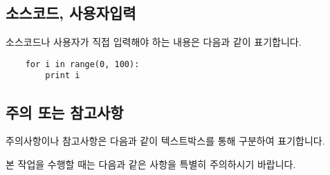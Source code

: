 \subsection*{소스코드, 사용자입력}
소스코드나 사용자가 직접 입력해야 하는 내용은 다음과 같이 표기합니다.
\begin{verbatim}
    for i in range(0, 100):
        print i
\end{verbatim}

\subsection*{주의 또는 참고사항}
주의사항이나 참고사항은 다음과 같이 텍스트박스를 통해 구분하여 표기합니다.
\begin{notice}
본 작업을 수행할 때는 다음과 같은 사항을 특별히 주의하시기 바랍니다.
\end{notice}
\clearpage






